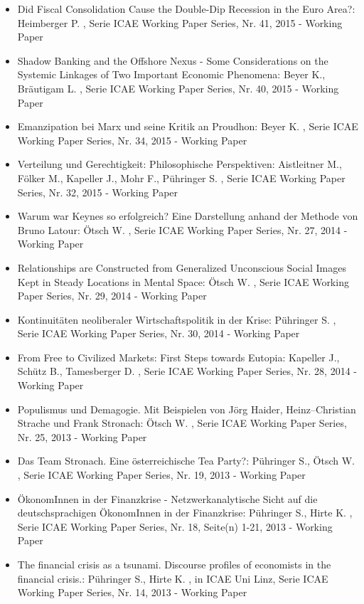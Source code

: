 \begin{itemize}
\item Did Fiscal Consolidation Cause the Double-Dip Recession in the Euro Area?: Heimberger P. , Serie ICAE Working Paper Series, Nr. 41, 2015 - Working Paper
\item Shadow Banking and the Offshore Nexus - Some Considerations on the Systemic Linkages of Two Important Economic Phenomena: Beyer K., Bräutigam L. , Serie ICAE Working Paper Series, Nr. 40, 2015 - Working Paper
\item Emanzipation bei Marx und seine Kritik an Proudhon: Beyer K. , Serie ICAE Working Paper Series, Nr. 34, 2015 - Working Paper
\item Verteilung und Gerechtigkeit: Philosophische Perspektiven: Aistleitner M., Fölker M., Kapeller J., Mohr F., Pühringer S. , Serie ICAE Working Paper Series, Nr. 32, 2015 - Working Paper
\item Warum war Keynes so erfolgreich? Eine Darstellung anhand der Methode von Bruno Latour: Ötsch W. , Serie ICAE Working Paper Series, Nr. 27, 2014 - Working Paper
\item Relationships are Constructed from Generalized Unconscious Social Images Kept in Steady Locations in Mental Space: Ötsch W. , Serie ICAE Working Paper Series, Nr. 29, 2014 - Working Paper
\item Kontinuitäten neoliberaler Wirtschaftspolitik in der Krise: Pühringer S. , Serie ICAE Working Paper Series, Nr. 30, 2014 - Working Paper
\item From Free to Civilized Markets: First Steps towards Eutopia: Kapeller J., Schütz B., Tamesberger D. , Serie ICAE Working Paper Series, Nr. 28, 2014 - Working Paper
\item Populismus und Demagogie. Mit Beispielen von Jörg Haider, Heinz–Christian Strache und Frank Stronach: Ötsch W. , Serie ICAE Working Paper Series, Nr. 25, 2013 - Working Paper
\item Das Team Stronach. Eine österreichische Tea Party?: Pühringer S., Ötsch W. , Serie ICAE Working Paper Series, Nr. 19, 2013 - Working Paper
\item ÖkonomInnen in der Finanzkrise - Netzwerkanalytische Sicht auf die deutschsprachigen ÖkonomInnen in der Finanzkrise: Pühringer S., Hirte K. , Serie ICAE Working Paper Series, Nr. 18, Seite(n) 1-21, 2013 - Working Paper
\item The financial crisis as a tsunami. Discourse profiles of economists in the financial crisis.: Pühringer S., Hirte K. , in ICAE Uni Linz, Serie ICAE Working Paper Series, Nr. 14, 2013 - Working Paper

\end{itemize}
